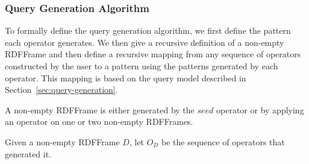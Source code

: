 
\subsubsection{Query Generation Algorithm}
To formally define the query generation algorithm, we first define the \sparql pattern each \rdfframes operator generates. 
We then give a recursive definition of a non-empty RDFFrame and then define a recursive mapping from any sequence of \rdfframes operators constructed by the user to a \sparql pattern using the patterns generated by each operator. This mapping is based on the query model %
described in Section~\ref{sec:query-generation}.

\vspace*{-8pt}
\begin{definition}
\label{def:recursivedataset}
	A non-empty RDFFrame is either generated by the $seed$ operator or by applying an \rdfframes operator on one or two non-empty RDFFrames. 
\end{definition}

\vspace*{-4pt}
Given a non-empty RDFFrame $D$, let $O_D$ be the sequence of \rdfframes operators that generated it. 

